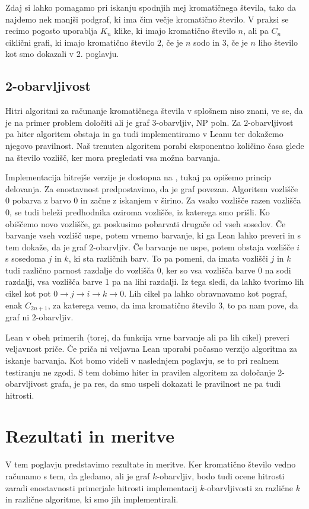 \documentclass[mat1]{fmfdelo}
\begin{document}
Zdaj si lahko pomagamo pri iskanju spodnjih mej kromatičnega števila, tako da najdemo nek manjši podgraf, ki 
ima čim večje kromatično število. V praksi se recimo pogosto uporablja $K_n$ klike, ki imajo kromatično število $n$, 
ali pa $C_n$ ciklični grafi, ki imajo kromatično število $2$, če je $n$ sodo in $3$, če je $n$ liho število kot smo dokazali v 2. poglavju. 

\subsection{2-obarvljivost}
Hitri algoritmi za računanje kromatičnega števila v splošnem niso znani, 
ve se, da je na primer problem določiti ali je graf $3$-obarvljiv, NP poln.
Za $2$-obarvljivost pa hiter algoritem obstaja in ga tudi implementiramo v Leanu ter dokažemo njegovo pravilnost. 
Naš trenuten algoritem porabi eksponentno količino časa glede na število vozlišč, ker mora pregledati vsa možna barvanja.

Implementacija hitrejše verzije je dostopna na \cite{leanG}, tukaj pa
opišemo princip delovanja. 
Za enostavnost predpostavimo, da je graf povezan.
Algoritem vozlišče $0$ pobarva z barvo $0$ in začne z iskanjem v širino. Za vsako vozlišče razen vozlišča 0, se tudi beleži
predhodnika oziroma vozlišče, iz katerega smo prišli. Ko obiščemo novo vozlišče, ga poskusimo pobarvati drugače od vseh sosedov.
Če barvanje vseh vozlišč uspe, potem vrnemo barvanje, ki ga Lean lahko preveri in s tem dokaže, da je graf $2$-obarvljiv.
Če barvanje ne uspe, potem obstaja vozlišče $i$ s sosedoma $j$ in $k$, ki sta različnih barv. To pa pomeni, da imata vozlišči $j$ in $k$
tudi različno parnost razdalje do vozlišča $0$, ker so vsa vozlišča barve 0 na sodi razdalji, vsa vozlišča barve 1 pa na lihi razdalji.
Iz tega sledi, da lahko tvorimo lih cikel kot pot $0\to j\to i\to k\to 0$. Lih cikel pa lahko obravnavamo kot pograf, enak $C_{2n+1}$, za katerega
vemo, da ima kromatično število $3$, to pa nam pove, da graf ni $2$-obarvljiv.

Lean v obeh primerih (torej, da funkcija vrne barvanje ali pa lih cikel) preveri veljavnost priče. Če priča ni veljavna
Lean uporabi počasno verzijo algoritma za iskanje barvanja. Kot bomo videli v naslednjem poglavju, se to pri realnem testiranju ne zgodi. 
S tem dobimo hiter in pravilen algoritem za določanje $2$-obarvljivost grafa, je pa res, da smo uspeli dokazati le pravilnost
ne pa tudi hitrosti.


\section{Rezultati in meritve}
V tem poglavju predstavimo rezultate in meritve.
Ker kromatično število vedno računamo s tem, da gledamo, ali je graf $k$-obarvljiv, bodo tudi ocene hitrosti zaradi enostavnosti
primerjale hitrosti implementacij $k$-obarvljivosti za različne $k$ in različne algoritme, ki smo jih implementirali. 
\end{document}
